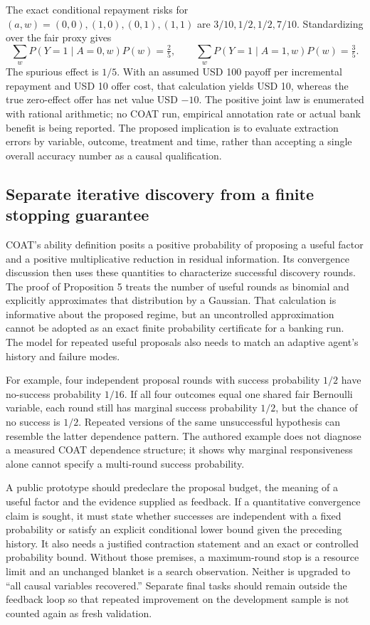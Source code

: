 The exact conditional repayment risks for $(a,w)=(0,0),(1,0),(0,1),(1,1)$
are $3/10,1/2,1/2,7/10$. Standardizing over the fair proxy gives
\begin{equation}
 \sum_w P(Y=1\mid A=0,w)P(w)=\tfrac25,
 \qquad
 \sum_w P(Y=1\mid A=1,w)P(w)=\tfrac35.
 \label{exec19:coat-proxy-effect}
\end{equation}
The spurious effect is $1/5$. With an assumed USD 100 payoff per incremental
repayment and USD 10 offer cost, that calculation yields USD 10, whereas the
true zero-effect offer has net value USD $-10$. The positive joint law is
enumerated with rational arithmetic; no COAT run, empirical annotation rate
or actual bank benefit is being reported. The proposed implication is to
evaluate extraction errors by variable, outcome, treatment and time, rather
than accepting a single overall accuracy number as a causal qualification.
\citep{exec19_coat_reference}

\subsection{Separate iterative discovery from a finite stopping guarantee}
\label{exec19:coat-attempts}
COAT's ability definition posits a positive probability of proposing a useful
factor and a positive multiplicative reduction in residual information. Its
convergence discussion then uses these quantities to characterize successful
discovery rounds. The proof of Proposition 5 treats the number of useful rounds
as binomial and explicitly approximates that distribution by a Gaussian.
That calculation is informative about the proposed regime, but an
uncontrolled approximation cannot be adopted as an exact finite probability
certificate for a banking run. The model for repeated useful proposals also
needs to match an adaptive agent's history and failure modes.\citep{exec19_coat}

For example, four independent proposal rounds with success probability $1/2$
have no-success probability $1/16$. If all four outcomes equal one shared
fair Bernoulli variable, each round still has marginal success probability
$1/2$, but the chance of no success is $1/2$. Repeated versions of the same
unsuccessful hypothesis can resemble the latter dependence pattern. The
authored example does not diagnose a measured COAT dependence structure; it
shows why marginal responsiveness alone cannot specify a multi-round success
probability.\citep{exec19_coat_reference}

A public prototype should predeclare the proposal budget, the meaning of a
useful factor and the evidence supplied as feedback. If a quantitative
convergence claim is sought, it must state whether successes are independent
with a fixed probability or satisfy an explicit conditional lower bound given
the preceding history. It also needs a justified contraction statement and an
exact or controlled probability bound. Without those premises, a maximum-round
stop is a resource limit and an unchanged blanket is a search observation.
Neither is upgraded to ``all causal variables recovered.'' Separate final
tasks should remain outside the feedback loop so that repeated improvement on
the development sample is not counted again as fresh validation.

